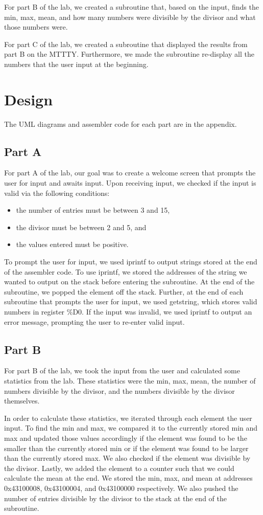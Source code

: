 \documentclass[10pt, letterpaper, titlepage]{article} %
\begin{document}
\begin{multicols*}{2}
For part B of the lab, we created a subroutine that, based on the input, finds the min, max, mean, and how many numbers were divisible by the divisor and what those numbers were.

For part C of the lab, we created a subroutine that displayed the results from part B on the MTTTY. 
Furthermore, we made the subroutine re-display all the numbers that the user input at the beginning. 

\section{Design}
The UML diagrams and assembler code for each part are in the appendix.

\subsection{Part A}
For part A of the lab, our goal was to create a welcome screen that prompts the user for input and awaits input. 
Upon receiving input, we checked if the input is valid via the following conditions:
\begin{itemize}
\item the number of entries must be between 3 and 15,
\item the divisor must be between 2 and 5, and
\item the values entered must be positive.
\end{itemize}

To prompt the user for input, we used iprintf to output strings stored at the end of the assembler code. 
To use iprintf, we stored the addresses of the string we wanted to output on the stack before entering the subroutine. 
At the end of the subroutine, we popped the element off the stack. 
Further, at the end of each subroutine that prompts the user for input, we used getstring, which stores valid numbers in register \%D0. 
If the input was invalid, we used iprintf to output an error message, prompting the user to re-enter valid input.

\subsection{Part B}
For part B of the lab, we took the input from the user and calculated some statistics from the lab. 
These statistics were the min, max, mean, the number of numbers divisible by the divisor, and the numbers divisible by the divisor themselves. 

In order to calculate these statistics, we iterated through each element the user input. 
To find the min and max, we compared it to the currently stored min and max and updated those values accordingly if the element was found to be the smaller than the currently stored min or if the element was found to be larger than the currently stored max. 
We also checked if the element was divisible by the divisor. 
Lastly, we added the element to a counter such that we could calculate the mean at the end. 
We stored the min, max, and mean at addresses 0x43100008, 0x43100004, and 0x43100000 respectively. 
We also pushed the number of entries divisible by the divisor to the stack at the end of the subroutine. 


\end{multicols*}
\end{document}
